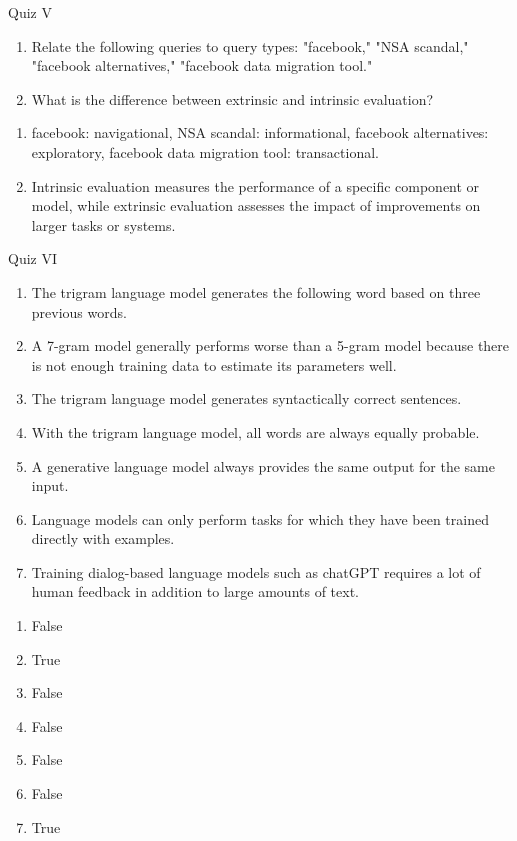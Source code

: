 \documentclass{article}
\begin{document}
\begin{exercise}{Quiz V}
  \begin{enumerate}
    \item Relate the following queries to query types: "facebook," "NSA scandal," "facebook alternatives," "facebook data migration tool."
    \item What is the difference between extrinsic and intrinsic evaluation?
  \end{enumerate}

  \begin{solution}
    \begin{enumerate}
      \item facebook: navigational, NSA scandal: informational, facebook alternatives: exploratory, facebook data migration tool: transactional.
      \item Intrinsic evaluation measures the performance of a specific component or model, while extrinsic evaluation assesses the impact of improvements on larger tasks or systems.
    \end{enumerate}
  \end{solution}
\end{exercise}

\begin{exercise}{Quiz VI}
  \begin{enumerate}
    \item The trigram language model generates the following word based on three previous words.
    \item A 7-gram model generally performs worse than a 5-gram model because there is not enough training data to estimate its parameters well.
    \item The trigram language model generates syntactically correct sentences.
    \item With the trigram language model, all words are always equally probable.
    \item A generative language model always provides the same output for the same input.
    \item Language models can only perform tasks for which they have been trained directly with examples.
    \item Training dialog-based language models such as chatGPT requires a lot of human feedback in addition to large amounts of text.
  \end{enumerate}

  \begin{solution}
    \begin{enumerate}
      \item False
      \item True
      \item False
      \item False
      \item False
      \item False
      \item True
    \end{enumerate}
  \end{solution}
\end{exercise}
\end{document}
